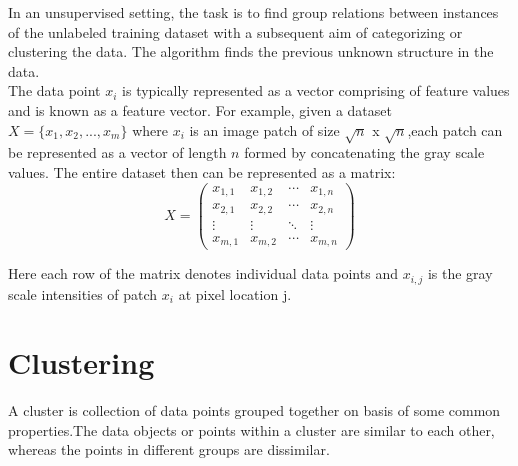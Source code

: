 In an unsupervised setting, the task is to find group relations between instances of the unlabeled training dataset with a subsequent aim of categorizing or clustering the data. The algorithm finds the previous unknown structure in the data.\\

The data point $x_i$ is typically represented as a vector comprising of feature values and is known as a feature vector. For example, given a dataset $X =\{x_1,x_2,...,x_m\}$ where $x_i$ is an image patch of size $\sqrt{n}$ x $\sqrt{n}$,each patch can be represented as a vector of length $n$ formed by concatenating the gray scale values. The entire dataset then can be represented as a matrix:
\begin{equation*}
X = \begin{pmatrix}
x_{1,1} & x_{1,2} & \cdots & x_{1,n} \\
x_{2,1} & x_{2,2} & \cdots & x_{2,n} \\
\vdots  & \vdots  & \ddots & \vdots  \\
x_{m,1} & x_{m,2} & \cdots & x_{m,n}
\end{pmatrix}
\end{equation*}

Here each row of the matrix denotes individual data points and ${x_{i,j}}$ is the gray scale intensities of patch $x_i$ at pixel location j.
%
%
%
%
%

\section{Clustering}
A cluster is collection of data points grouped together on basis of some common properties.The data objects or points within a cluster are similar to each other, whereas the points in different groups are dissimilar.\\

